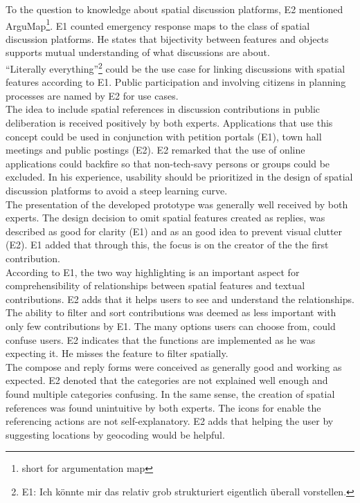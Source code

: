 To the question to knowledge about spatial discussion platforms, E2 mentioned ArguMap\footnote{short for argumentation map}. E1 counted emergency response maps to the class of spatial discussion platforms. He states that bijectivity between features and objects supports mutual understanding of what discussions are about.\\
``Literally everything''\footnote{E1: Ich k{\"o}nnte mir das relativ grob strukturiert eigentlich {\"u}berall vorstellen.} could be the use case for linking discussions with spatial features according to E1. Public participation and involving citizens in planning processes are named by E2 for use cases.\\
The idea to include spatial references in discussion contributions in public deliberation is received positively by both experts. Applications that use this concept could be used in conjunction with petition portals (E1), town hall meetings and public postings (E2). E2 remarked that the use of online applications could backfire so that non-tech-savy persons or groups could be excluded. In his experience, usability should be prioritized in the design of spatial discussion platforms to avoid a steep learning curve.\\
The presentation of the developed prototype was generally well received by both experts. The design decision to omit spatial features created as replies, was described as good for clarity (E1) and as an good idea to prevent visual clutter (E2). E1 added that through this, the focus is on the creator of the the first contribution.\\
According to E1, the two way highlighting is an important aspect for comprehensibility of relationships between spatial features and textual contributions. E2 adds that it helps users to see and understand the relationships.\\
The ability to filter and sort contributions was deemed as less important with only few contributions by E1. The many options users can choose from, could confuse users. E2 indicates that the functions are implemented as he was expecting it. He misses the feature to filter spatially.\\
The compose and reply forms were conceived as generally good and working as expected. E2 denoted that the categories are not explained well enough and found multiple categories confusing. In the same sense, the creation of spatial references was found unintuitive by both experts. The icons for enable the referencing actions are not self-explanatory. E2 adds that helping the user by suggesting locations by geocoding would be helpful.\\



